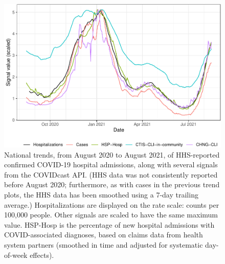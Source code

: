 \documentclass[9pt,twoside,lineno]{pnas-new}
\begin{document}
\begin{figure}

{\centering \includegraphics[width=\textwidth]{fig/hospitalization_time_trends_national-1} 

}

\caption{National trends, from August 2020 to August 2021, of HHS-reported confirmed COVID-19 hospital admissions, along with several signals from the COVIDcast API. (HHS data was not consistently reported before August 2020; furthermore, as with cases in the previous trend plots, the HHS data has been smoothed using a 7-day trailing average.) Hospitalizations are displayed on the rate scale: counts per 100,000 people. Other signals are scaled to have the same maximum value. HSP-Hosp is the percentage of new hospital admissions with COVID-associated diagnoses, based on claims data from health system partners (smoothed in time and adjusted for systematic day-of-week effects).}\label{fig:hospitalization_time_trends_national}
\end{figure}

\clearpage
\end{document}
